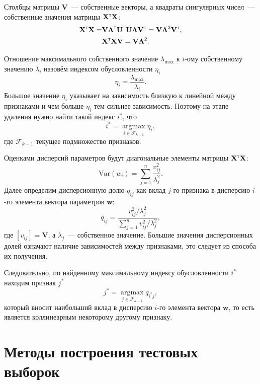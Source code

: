 \documentclass[a4paper,12pt]{article}
\newcommand{\bw}{\mathbf{w}}
\newcommand{\bX}{\mathbf{X}}
\newcommand{\bU}{\mathbf{U}}
\newcommand{\bV}{\mathbf{V}}
\newcommand{\T}{{\text{\tiny\sffamily\upshape\mdseries T}}}
\begin{document}
Столбцы матрицы $\bV$~--- собственные векторы, а квадраты сингулярных чисел~--- собственные значения матрицы $\bX^{\T}\bX$:
\begin{equation*}
\begin{split}
\bX^{\T}\bX = & \bV\boldsymbol{\Lambda}^{\T}\bU^{\T}\bU
\boldsymbol{\Lambda}\bV^{\T} = \bV\boldsymbol{\Lambda}^2\bV^{\T},\\
&\bX^{\T}\bX\bV = \bV\boldsymbol{\Lambda}^2.
\end{split}
\label{eq:sing_dec}
\end{equation*}
 
Отношение максимального собственного значение $\lambda_{\max}$ к $i$-ому собственному значению $\lambda_i$ назовём индексом обусловленности $\eta_i$
\[
\eta_i = \frac{\lambda_{\max}}{\lambda_i}.
\]
Большое значение $\eta_i$ указывает на зависимость близкую к линейной между признаками и чем больше $\eta_i$ тем сильнее зависимость.
Поэтому на этапе удаления нужно найти такой индекс $i^*$, что
\[
i^* = \mathop{\arg\max}\limits_{i \in \mathcal{F}_{k-1}} \eta_i,
\]
где $\mathcal{F}_{k-1}$ текущее подмножество признаков.

Оценками дисперсий параметров будут диагональные элементы матрицы $\bX^{\T}\bX$:
\[
\text{Var}(w_i) = \sum\limits_{j = 1} ^n \frac{v_{ij}^2} {\lambda^2_j}.
\]
Далее определим дисперсионную долю $q_{ij}$ как вклад $j$-го признака в дисперсию $i$-го элемента вектора параметров $\bw$:
\[
q_{ij} = \frac{v_{ij}^2 / \lambda^2_j}{\sum\limits_{j = 1} ^n v_{ij}^2 / \lambda^2_j},
\] 
где $[v_{ij}] = \bV$, а $\lambda_j$~--- собственное значение. 
Большие значения дисперсионных долей означают наличие зависимостей между признаками, это следует из способа их получения.

Следовательно, по найденному максимальному индексу обусловленности $i^*$ находим признак $j^*$
\begin{equation}
j^* = \mathop{\arg\max}\limits_{j \in \mathcal{F}_{k-1}} q_{i^*j},
\label{eq:belsley}
\end{equation}
который вносит наибольший вклад в дисперсию $i$-го элемента вектора $\bw$, то есть является коллинеарным некоторому другому признаку.

\section{Методы построения тестовых выборок}
\end{document}
